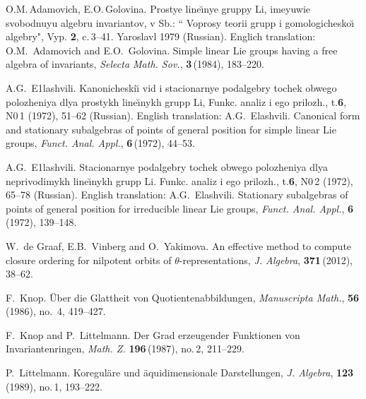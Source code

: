 \begin{thebibliography}{Pa95}

 {{\tencysc\cyracc} O.M.\,Adamovich, E.O.\,Golovina}.
{{\tencyr\cyracc} Prostye line{\u\i}nye gruppy Li, imeyuwie  svobodnuyu  al\-geb\-ru
invariantov, 
v Sb.:} ``{{\tencyi\cyracc} Voprosy teorii grupp i gomologichesko{\u\i} algebry}",
{{\tencyr\cyracc} Vyp.} {\bf 2}, c.\,3--41. {{\tencyr\cyracc} Yaroslavl\cprime} 1979 (Russian).
Englich translation: {\sc O.M.~Adamovich} and {\sc E.O.~Golovina.}
Simple linear Lie groups having a free algebra of invariants,
{\it Selecta Math. Sov.}, {\bf 3}\,(1984), 183--220.

{{\tencysc\cyracc} A.G.~{E1}lashvili}. {{\tencyr\cyracc} Kanonicheski{\u\i} vid i stacionarnye podalgebry
tochek obwego po\-lo\-zhe\-niya dlya prostykh line\u\i nykh grupp Li},
{{\tencyi\cyracc} Funkc. analiz i ego prilozh.}, {{\tencyr\cyracc} t.}{\bf 6}, {{\tencyr\cyracc} N0}\,1 (1972), 51--62 (Russian).
English translation: {\sc A.G.~Elashvili}.
Canonical form and stationary subalgebras of points of
general position for simple linear Lie groups, {\it Funct. Anal. Appl.},
{\bf 6}\,(1972), 44--53.

{{\tencysc\cyracc} A.G.~{E1}lashvili}. {{\tencyr\cyracc} Stacionarnye podalgebry
tochek obwego po\-lo\-zhe\-niya dlya neprivodimykh line\u\i nykh grupp Li}.
{{\tencyi\cyracc} Funkc. analiz i ego prilozh.}, {{\tencyr\cyracc} t.}{\bf 6}, {{\tencyr\cyracc} N0}\,2 (1972), 65--78 (Russian).
English translation: {\sc A.G.~Elashvili}. Stationary subalgebras of points of general position for 
irreducible linear Lie groups, 
{\it Funct. Anal. Appl.}, {\bf 6}\,(1972), 139--148.

{\sc W.~de Graaf, E.B.~Vinberg} and {\sc O.~Yakimova}.
 An effective method to compute closure ordering for nilpotent orbits of $\theta$-representations,
 {\it J. Algebra}, {\bf 371}\,(2012), 38--62.

  {\sc F.~Knop}. \"Uber die Glattheit von Quotientenabbildungen,
{\it Manuscripta Math.}, {\bf 56}\,(1986), no.~4, 419--427.

  {\sc F.~Knop} and {\sc P.~Littelmann}.
Der Grad erzeugender Funktionen von Invariantenringen, {\it Math. Z.} {\bf 196}\,(1987), no.\,2, 211--229.

 {\sc P.~Littelmann}. Koregul\"are und \"aquidimensionale Darstellungen,
{\it J. Algebra}, {\bf 123}\,(1989), no.\,1, 193--222.


\end{thebibliography}
